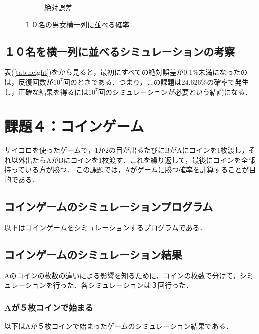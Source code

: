 \documentclass[a4j, titlepage]{jarticle}
\begin{document}
\begin{figure}[htb]
\begin{subfigure}[b]{0.38\textwidth}
          \caption{絶対誤差}
          \label{fig:errheight}
        \end{subfigure}
        \hfill
            \caption{１０名の男女横一列に並べる確率}
            \label{fig:resheight}
      \end{figure}

    \subsection{１０名を横一列に並べるシミュレーションの考察}
      表(\ref{tab:height})をから見ると，最初にすべての絶対誤差が$0.1\%$未満になったのは，反復回数が$10^7$回のときである．つまり，この課題は$24.626\%$の確率で発生し，正確な結果を得るには$10^7$回のシミュレーションが必要という結論になる．

  \section{課題４：コインゲーム}
    サイコロを使ったゲームで，1か2の目が出るたびにBがAにコインを1枚渡し，それ以外出たらAがBにコインを1枚渡す．これを繰り返して，最後にコインを全部持っている方が勝つ．
    この課題では，Aがゲームに勝つ確率を計算することが目的である．
    
    \subsection{コインゲームのシミュレーションプログラム}
      以下はコインゲームをシミュレーションするプログラムである．
       
    
    \subsection{コインゲームのシミュレーション結果}
      Aのコインの枚数の違いによる影響を知るために，コインの枚数で分けて，シミュレーションを行った．各シミュレーションは３回行った．
      
      \subsubsection{Aが５枚コインで始まる}
        以下はAが５枚コインで始まったゲームのシミュレーション結果である．
\end{document}
